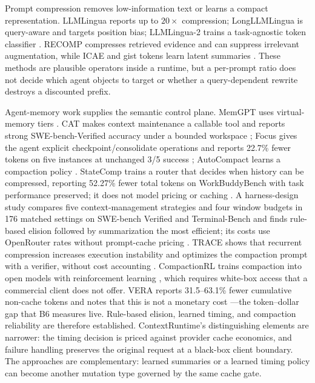 \documentclass[10pt,twocolumn]{article}
\begin{document}
Prompt compression removes low-information text or learns a compact representation.  LLMLingua
reports up to $20\times$ compression; LongLLMLingua is query-aware and targets position bias;
LLMLingua-2 trains a task-agnostic token classifier \cite{jiang2023llmlingua,
jiang2024longllmlingua,pan2024llmlingua2}.  RECOMP compresses retrieved evidence and can suppress
irrelevant augmentation, while ICAE and gist tokens learn latent summaries
\cite{xu2024recomp,ge2024icae,mu2023gist}.  These methods are plausible operators inside a runtime,
but a per-prompt ratio does not decide which agent objects to target or whether a query-dependent
rewrite destroys a discounted prefix.

Agent-memory work supplies the semantic control plane.  MemGPT uses virtual-memory tiers
\cite{packer2023memgpt}.  CAT makes context maintenance a callable tool and reports strong
SWE-bench-Verified accuracy under a bounded workspace \cite{liu2026cat}; Focus gives the agent
explicit checkpoint/consolidate operations and reports 22.7\% fewer tokens on five instances at
unchanged 3/5 success \cite{verma2026focus}; AutoCompact learns a compaction policy
\cite{zhang2026autocompact}.  StateComp trains a router that decides when history can be compressed,
reporting 52.27\% fewer total tokens on WorkBuddyBench with task performance preserved; it does not
model pricing or caching \cite{wang2026statecomp}.  A harness-design study compares five
context-management strategies and four window budgets in 176 matched settings on SWE-bench Verified and
Terminal-Bench and finds rule-based elision followed by summarization the most efficient; its costs use
OpenRouter rates without prompt-cache pricing \cite{fan2026harness}.  TRACE shows that recurrent
compression increases execution instability and optimizes the compaction prompt with a verifier,
without cost accounting \cite{min2026trace}.  CompactionRL trains compaction into open models with
reinforcement learning \cite{li2026compactionrl}, which requires white-box access that a commercial
client does not offer.  VERA reports 31.5--63.1\% fewer cumulative non-cache
tokens and notes that this is not a monetary cost \cite{su2026vera}---the token--dollar gap that B6
measures live.  Rule-based elision, learned timing, and compaction reliability are therefore
established.  ContextRuntime's distinguishing elements are narrower: the timing decision is priced
against provider cache economics, and failure handling preserves the original request at a black-box
client boundary.  The approaches are complementary: learned summaries or a learned timing policy can
become another mutation type governed by the same cache gate.
\end{document}
